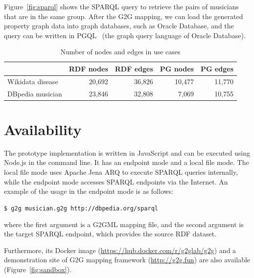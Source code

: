 \documentclass[runningheads]{llncs}
\begin{document}
Figure~\ref{fig:sparql} shows the SPARQL query to retrieve the pairs of musicians that are in the same group. After the G2G mapping, we can load the generated property graph data into graph databases, such as Oracle Database, and the query can be written in PGQL~\cite{pgql} (the graph query language of Oracle Database).

\begin{table}[h]
    \centering
    \begin{tabular}{l|r|r|r|r}
        \hline
        & RDF nodes & RDF edges & PG nodes & PG edges \\
        \hline
        Wikidata disease & 20,692 & 36,826 & 10,477 & 11,770 \\
        DBpedia musician & 23,846 & 32,808 & 7,069 & 10,755 \\
        \hline
    \end{tabular}
    \caption{Number of nodes and edges in use cases}
    \label{table:numbers}
\end{table}


\section{Availability}
The prototype implementation is written in JavaScript and can be executed using Node.js in the command line. It has an endpoint mode and a local file mode. The local file mode uses Apache Jena ARQ to execute SPARQL queries internally, while the endpoint mode accesses SPARQL endpoints via the Internet. An example of the usage in the endpoint mode is as follows:

\texttt{\$ g2g musician.g2g http://dbpedia.org/sparql}

\noindent where the first argument is a G2GML mapping file, and the second argument is the target SPARQL endpoint, which provides the source RDF dataset. %

Furthermore, its Docker image (\url{https://hub.docker.com/r/g2glab/g2g}) and a demonstration site of G2G mapping framework (\url{http://g2g.fun}) are also available (Figure~\ref{fig:sandbox}).
\end{document}
